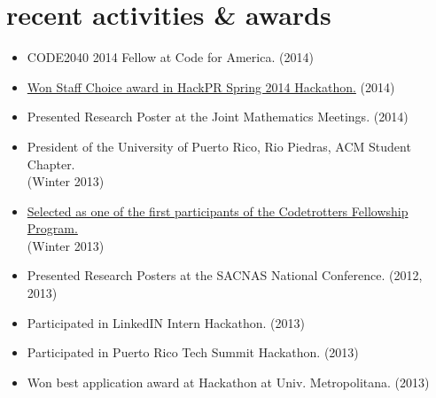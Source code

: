 \documentclass[]{friggeri-cv}
\begin{document}
\section{recent activities \& awards}
\begin{itemize}
\item CODE2040 2014 Fellow at Code for America. (2014)
\item \href{https://github.com/chrisrodz/gh-backups}{Won Staff Choice award in HackPR Spring 2014 Hackathon.} (2014)
\item Presented Research Poster at the Joint Mathematics Meetings. (2014)
\item President of the University of Puerto Rico, Rio Piedras, ACM Student Chapter. \\ (Winter 2013)
\item \href{http://codetrotters.com}{Selected as one of the first participants of the Codetrotters Fellowship Program.} \\ (Winter 2013)
\item Presented Research Posters at the SACNAS National Conference. (2012, 2013)
\item Participated in LinkedIN Intern Hackathon. (2013)
\item Participated in Puerto Rico Tech Summit Hackathon. (2013)
\item Won best application award at Hackathon at Univ. Metropolitana. (2013)
\end{itemize}
\end{document}
